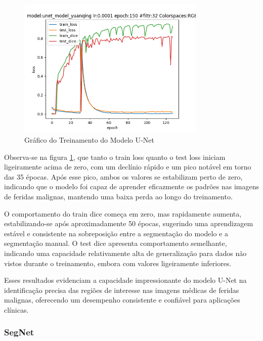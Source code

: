           \begin{figure}[H]
            \centering
            \includegraphics[width=0.8\textwidth]{img/unetprunedmodelfile.png}
            \caption{ Gráfico do Treinamento do Modelo \acf{U-Net} }
            \label{fig:graphU-Net}
          \end{figure}

        Observa-se na figura \ref{fig:graphU-Net}, que tanto o train loss quanto o test loss iniciam ligeiramente acima de zero, com um declínio rápido e um pico notável em torno das 35 épocas. Após esse pico, ambos os valores se estabilizam perto de zero, indicando que o modelo foi capaz de aprender eficazmente os padrões nas imagens de feridas malignas, mantendo uma baixa perda ao longo do treinamento.

        O comportamento do train dice começa em zero, mas rapidamente aumenta, estabilizando-se após aproximadamente 50 épocas, sugerindo uma aprendizagem estável e consistente na sobreposição entre a segmentação do modelo e a segmentação manual. O test dice apresenta comportamento semelhante, indicando uma capacidade relativamente alta de generalização para dados não vistos durante o treinamento, embora com valores ligeiramente inferiores.

        Esses resultados evidenciam a capacidade impressionante do modelo U-Net na identificação precisa das regiões de interesse nas imagens médicas de feridas malignas, oferecendo um desempenho consistente e confiável para aplicações clínicas.

          
    \subsubsection{SegNet}

